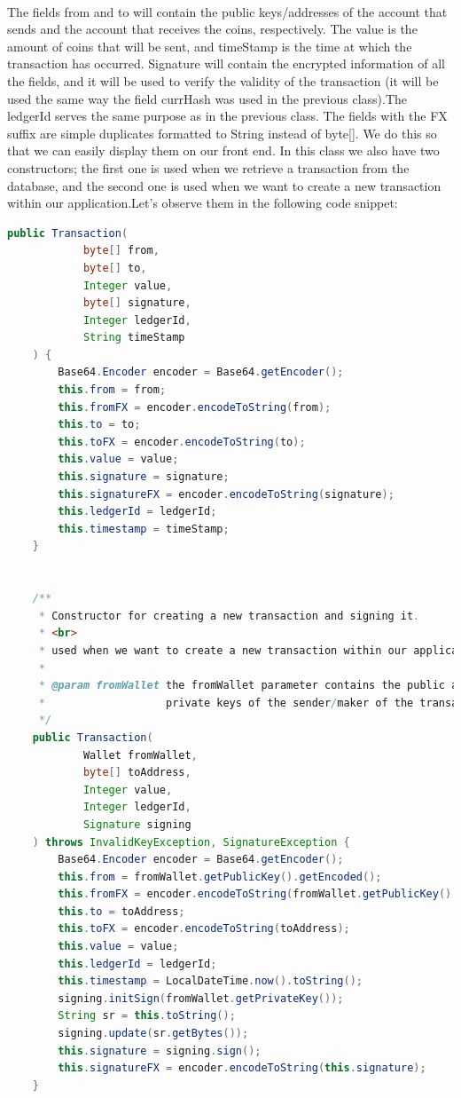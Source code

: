 \documentclass[12pt,a4paper]{report}
\begin{document}
\paragraph{}
The fields from and to will contain the public keys/addresses of the account that sends and the account that receives the coins, respectively. 
The value is the amount of coins that will be sent, and timeStamp is the time at which the transaction has occurred. Signature will contain the encrypted information of all the fields, and it will be used to verify the validity of the transaction (it will be used the same way the field currHash was used in the previous class).The ledgerId serves the same purpose as in the previous class. The fields with the FX suffix are simple duplicates formatted to String instead of byte[]. We do this so that we can easily display them on our front end.
In this class we also have two constructors; the first one is used when we retrieve a transaction from the database, and the second one is used when we want to create a new transaction within our application.Let’s observe them in the following code snippet:
\begin{lstlisting}[language=Java]
    public Transaction(
            byte[] from,
            byte[] to,
            Integer value,
            byte[] signature,
            Integer ledgerId,
            String timeStamp
    ) {
        Base64.Encoder encoder = Base64.getEncoder();
        this.from = from;
        this.fromFX = encoder.encodeToString(from);
        this.to = to;
        this.toFX = encoder.encodeToString(to);
        this.value = value;
        this.signature = signature;
        this.signatureFX = encoder.encodeToString(signature);
        this.ledgerId = ledgerId;
        this.timestamp = timeStamp;
    }


    /**
     * Constructor for creating a new transaction and signing it.
     * <br>
     * used when we want to create a new transaction within our application
     *
     * @param fromWallet the fromWallet parameter contains the public and
     *                   private keys of the sender/maker of the transaction.
     */
    public Transaction(
            Wallet fromWallet,
            byte[] toAddress,
            Integer value,
            Integer ledgerId,
            Signature signing
    ) throws InvalidKeyException, SignatureException {
        Base64.Encoder encoder = Base64.getEncoder();
        this.from = fromWallet.getPublicKey().getEncoded();
        this.fromFX = encoder.encodeToString(fromWallet.getPublicKey().getEncoded());
        this.to = toAddress;
        this.toFX = encoder.encodeToString(toAddress);
        this.value = value;
        this.ledgerId = ledgerId;
        this.timestamp = LocalDateTime.now().toString();
        signing.initSign(fromWallet.getPrivateKey());
        String sr = this.toString();
        signing.update(sr.getBytes());
        this.signature = signing.sign();
        this.signatureFX = encoder.encodeToString(this.signature);
    }

\end{lstlisting}
\end{document}
